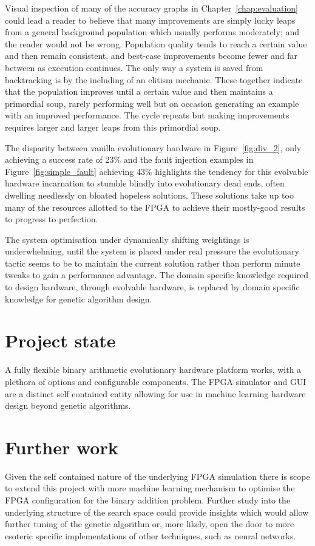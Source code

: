 Visual inspection of many of the accuracy graphs in Chapter~\ref{chap:evaluation}
could lead a reader to believe that many improvements are simply lucky leaps from
a general background population which usually performs moderately; and the reader
would not be wrong. Population quality tends to reach a certain value and then
remain consistent, and best-case improvements become fewer and far between as
execution continues. The only way a system is saved from backtracking is by the
including of an elitism mechanic. These together indicate that the population improves
until a certain value and then maintains a primordial soup, rarely performing well
but on occasion generating an example with an improved performance. The cycle repeats
but making improvements requires larger and larger leaps from this primordial soup.

The disparity between vanilla evolutionary hardware in Figure~\ref{fig:div_2}, only
achieving a success rate of 23\% and the fault injection examples in
Figure~\ref{fig:simple_fault} achieving 43\% highlights the tendency for
this evolvable hardware incarnation to stumble blindly into evolutionary dead ends,
often dwelling needlessly on bloated hopeless solutions. These solutions take up
too many of the resources allotted to the FPGA to achieve their mostly-good results
to progress to perfection.

The system optimisation under dynamically shifting weightings is underwhelming,
until the system is placed under real pressure the evolutionary tactic seems to be
to maintain the current solution rather than perform minute tweaks to gain a performance
advantage. The domain specific knowledge required to design hardware, through
evolvable hardware, is replaced by domain specific knowledge for genetic algorithm
design.

\section{Project state}
A fully flexible binary arithmetic evolutionary hardware platform works, with
a plethora of options and configurable components. The FPGA simulator and GUI are a distinct
self contained entity allowing for use in machine learning hardware design beyond
genetic algorithms.

\section{Further work}
Given the self contained nature of the underlying FPGA simulation there is scope to
extend this project with more machine learning mechanism to optimise the FPGA
configuration for the binary addition problem. Further study into the underlying
structure of the search space could provide insights which would allow further
tuning of the genetic algorithm or, more likely, open the door to more esoteric
specific implementations of other techniques, such as neural networks.


